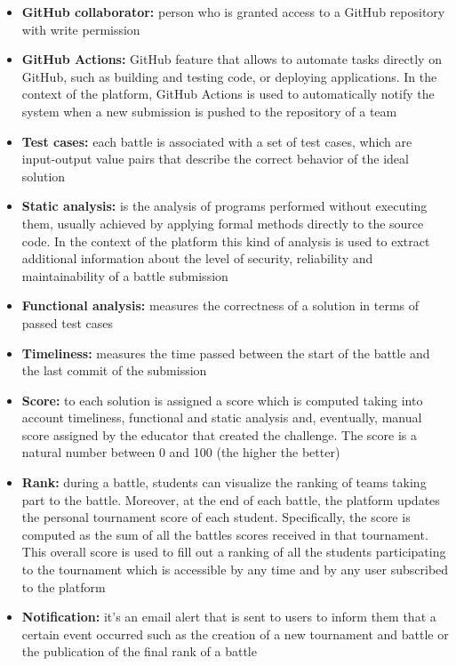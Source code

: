\begin{itemize}
    \item {\textbf{GitHub collaborator:} person who is granted access to a GitHub repository with write permission}
    \item {\textbf{GitHub Actions:} GitHub feature that allows to automate tasks directly on GitHub, such as building and testing code, or deploying applications. In the context of the platform, GitHub Actions is used to automatically notify the system when a new submission is pushed to the repository of a team}
    \item {\textbf{Test cases:} each battle is associated with a set of test cases, which  are input-output value pairs that describe the correct behavior of the ideal solution}
    \item {\textbf{Static analysis:} is the analysis of programs performed without executing them, usually achieved by applying formal methods directly to the source code. In the context of the platform this kind of analysis is used to extract additional information about the level of security, reliability and maintainability of a battle submission}
    \item {\textbf{Functional analysis:} measures the correctness of a solution in terms of passed test cases}
    \item {\textbf{Timeliness:} measures the time passed between the start of the battle and the last commit of the submission}
    \item {\textbf{Score:} to each solution is assigned a score which is computed taking into account timeliness, functional and static analysis and, eventually, manual score assigned by the educator that created the challenge. The score is a natural number between 0 and 100 (the higher the better)}
    \item {\textbf{Rank:} during a battle, students can visualize the ranking of teams taking part to the battle. Moreover, at the end of each battle, the platform updates the personal tournament score of each student. Specifically, the score is computed as the sum of all the battles scores received in that tournament. This overall score is used to fill out a ranking of all the students participating to the tournament which is accessible by any time and by any user subscribed to the platform}
    \item {\textbf{Notification:} it's an  email alert that is sent to users to inform them that a certain event occurred such as the creation of a new tournament and battle or the publication of the final rank of a battle}

\end{itemize}
